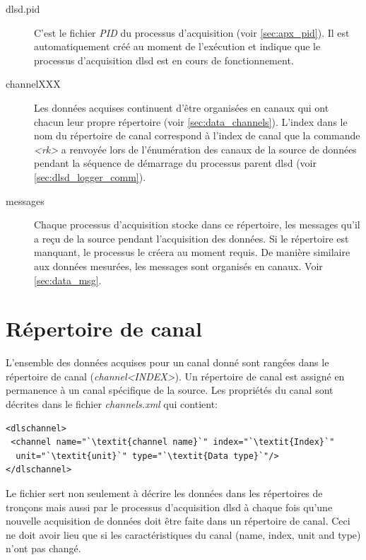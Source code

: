 \documentclass[a4paper,12pt,BCOR6mm,bibtotoc,idxtotoc]{scrbook}
\begin{document}
\begin{description}
\item[dlsd.pid]
  C'est le fichier \textit{PID} du processus d'acquisition
  (voir \autoref{sec:apx_pid}). Il est automatiquement cr\'e\'e
  au moment de l'ex\'ecution et indique que le processus d'acquisition
  dlsd est en cours de fonctionnement.

\item[channelXXX]
  Les donn\'ees acquises continuent d'\^etre organis\'ees en canaux
  qui ont chacun leur propre r\'epertoire (voir \autoref{sec:data_channels}).
  L'index dans le nom du r\'epertoire de canal correspond \`a l'index de canal
  que la commande \textit{\textless rk\textgreater} a renvoy\'ee
  lors de l'\'enum\'eration des canaux de la source de donn\'ees
  pendant la s\'equence de d\'emarrage du processus parent dlsd
  (voir \autoref{sec:dlsd_logger_comm}).

\item[messages]
  Chaque processus d'acquisition stocke dans ce r\'epertoire, les
  messages qu'il a re\c cu de la source pendant l'acquisition des
  donn\'ees.  Si le r\'epertoire est manquant, le processus le
  cr\'eera au moment requis.  De mani\`ere similaire aux donn\'ees
  mesur\'ees, les messages sont organis\'es en canaux. Voir
  \autoref{sec:data_msg}.

\end{description}



\section{R\'epertoire de canal}
\label{sec:data_channels}

L'ensemble des donn\'ees acquises pour un canal donn\'e sont rang\'ees
dans le r\'epertoire de canal (\textit{channel\textless INDEX\textgreater}).
Un r\'epertoire de canal est assign\'e en permanence \`a un canal sp\'ecifique de la source.
Les propri\'et\'es du canal sont d\'ecrites dans le fichier \textit{channels.xml}
qui contient:

\begin{lstlisting}
<dlschannel>
 <channel name="`\textit{channel name}`" index="`\textit{Index}`"
  unit="`\textit{unit}`" type="`\textit{Data type}`"/>
</dlschannel>
\end{lstlisting}

Le fichier sert non seulement \`a d\'ecrire les donn\'ees dans les r\'epertoires de
tron\c cons mais aussi par le processus d'acquisition dlsd
\`a chaque fois qu'une nouvelle acquisition de donn\'ees
doit \^etre faite dans un r\'epertoire de canal.
Ceci ne doit avoir lieu que si les caract\'eristiques du canal
(name, index, unit and type) n'ont pas chang\'e.
\end{document}
